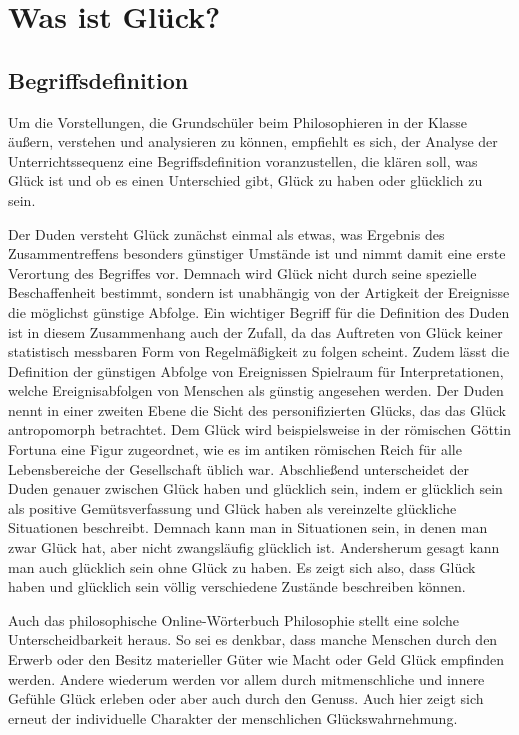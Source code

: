 \section{Was ist Glück?}
\subsection{Begriffsdefinition}

Um die Vorstellungen, die Grundschüler beim Philosophieren in der Klasse äußern, verstehen und analysieren zu können, empfiehlt es sich, der Analyse der Unterrichtssequenz eine Begriffsdefinition voranzustellen, die klären soll, was Glück ist und ob es einen Unterschied gibt, Glück zu \glqq haben\grqq{} oder \glqq glücklich\grqq{} zu sein.

Der Duden versteht Glück zunächst einmal als \glqq etwas, was Ergebnis des Zusammentreffens besonders günstiger Umstände ist\grqq{}\cite{D16} und nimmt damit eine erste Verortung des Begriffes vor. 
Demnach wird Glück nicht durch seine spezielle Beschaffenheit bestimmt, sondern ist unabhängig von der Artigkeit der Ereignisse die möglichst günstige Abfolge.
 Ein wichtiger Begriff für die Definition des Duden ist in diesem Zusammenhang auch der Zufall, da das Auftreten von Glück keiner statistisch messbaren Form von Regelmäßigkeit zu folgen scheint. 
 Zudem lässt die Definition der günstigen Abfolge von Ereignissen Spielraum für Interpretationen, welche Ereignisabfolgen von Menschen als günstig angesehen werden.  
 Der Duden nennt in einer zweiten Ebene die Sicht des personifizierten Glücks, das das Glück antropomorph betrachtet. 
 Dem Glück wird beispielsweise in der römischen Göttin Fortuna eine Figur zugeordnet, wie es im antiken römischen Reich für alle Lebensbereiche der Gesellschaft üblich war. 
 Abschließend unterscheidet der Duden genauer zwischen Glück haben und glücklich sein, indem er \glqq glücklich sein\grqq{} als positive Gemütsverfassung und \glqq Glück haben\grqq{} als vereinzelte glückliche Situationen beschreibt\cite{D16}.
  Demnach kann man in Situationen sein, in denen man zwar Glück hat, aber nicht zwangsläufig glücklich ist. 
 Andersherum gesagt kann man auch glücklich sein ohne Glück zu haben. 
 Es zeigt sich also, dass \glqq Glück haben\grqq{} und \glqq glücklich sein\grqq{} völlig verschiedene Zustände beschreiben können. 
 
Auch das philosophische Online-Wörterbuch Philosophie stellt eine solche Unterscheidbarkeit heraus. 
So sei es denkbar, dass manche Menschen durch den Erwerb oder den Besitz materieller Güter wie Macht oder Geld Glück empfinden werden. 
Andere wiederum werden vor allem durch mitmenschliche und innere Gefühle Glück erleben oder aber auch durch den Genuss\cite{GT16}. 
Auch hier zeigt sich erneut der individuelle Charakter der menschlichen Glückswahrnehmung. 

